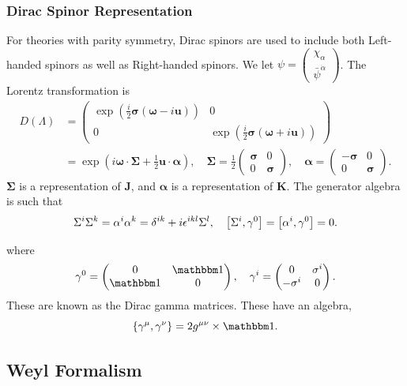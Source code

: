 \documentclass{article}
\begin{document}
\subsubsection{Dirac Spinor Representation}

For theories with parity symmetry, Dirac spinors are used to include both Left-handed spinors as well as Right-handed spinors. We let $\psi=\begin{pmatrix}\chi_\alpha\\\bar\psi^{\dot\alpha}\end{pmatrix}$. The Lorentz transformation is 
\begin{align*}
    D(\Lambda)&=\begin{pmatrix}\exp\left(\frac i2\boldsymbol\sigma(\boldsymbol\omega-i\mathbf u)\right)&0\\0&\exp\left(\frac i2\boldsymbol\sigma(\boldsymbol\omega+i\mathbf u)\right)\end{pmatrix}\\
    &=\exp\left(i\boldsymbol\omega\cdot\boldsymbol\Sigma+\frac 12\mathbf u\cdot\boldsymbol\alpha\right),\quad\boldsymbol\Sigma=\frac 12\begin{pmatrix}\boldsymbol\sigma&0\\0&\boldsymbol\sigma\end{pmatrix},\quad\boldsymbol\alpha=\begin{pmatrix}-\boldsymbol\sigma&0\\0&\boldsymbol\sigma\end{pmatrix}.
\end{align*}
$\boldsymbol\Sigma$ is a representation of $\mathbf J$, and $\boldsymbol\alpha$ is a representation of $\mathbf K$. The generator algebra is such that
$$\Sigma^i\Sigma^k=\alpha^i\alpha^k=\delta^{ik}+i\epsilon^{ikl}\Sigma^l,\quad\comm{\Sigma^i}{\gamma^0}=\comm{\alpha^i}{\gamma^0}=0.$$

where
$$\gamma^0=\begin{pmatrix}0&\mathbbm 1\\\mathbbm 1&0\end{pmatrix},\quad\gamma^i=\begin{pmatrix}0&\sigma^i\\-\sigma^i&0\end{pmatrix}.$$
These are known as the Dirac gamma matrices. These have an algebra,
$$\acomm{\gamma^\mu}{\gamma^\nu}=2g^{\mu\nu}\times\mathbbm 1.$$

\subsection{Weyl Formalism}
\end{document}

